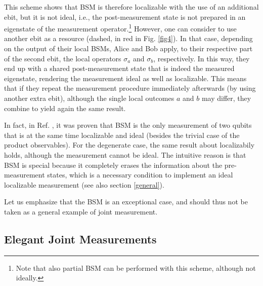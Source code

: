 \documentclass[a4paper,twocolumn,11pt,accepted=2024-02-14]{quantumarticle}
\begin{document}
This scheme shows that BSM is therefore localizable with the use of an additional ebit, but it is not ideal, i.e., the post-measurement state is not prepared in an eigenstate of the measurement operator.\footnote{Note that also partial BSM can be performed with this scheme, although not ideally.} However, one can consider to use another ebit as a resource (dashed, in red in Fig. \ref{fig4}). In that case, depending on the output of their local BSMs, Alice and Bob apply, to their respective part of the second ebit, the local operators $\sigma_a$ and $\sigma_b$, respectively. In this way, they end up with a shared post-measurement state that is indeed the measured eigenstate, rendering the measurement ideal as well as localizable. This means that if they repeat the measurement procedure immediately afterwards (by using another extra ebit), although the single local outcomes $a$ and $b$ may differ, they combine to yield again the same result.


In fact, in Ref. \cite{popescu1994causality}, it was proven that BSM is the only measurement of two qubits that is at the same time localizable and ideal (besides the trivial case of the product observables). For the degenerate case, the same result about localizabily holds, although the measurement cannot be ideal. The intuitive reason is that BSM is special because it completely erases the information about the pre-measurement states, which is a necessary condition to implement an ideal localizable measurement \cite{popescu1994causality} (see also section \ref{general}). 

Let us emphasize that the BSM is an exceptional case, and should thus not be taken as a general example of joint measurement.



\subsection{Elegant Joint Measurements}
\label{ejm}
\end{document}

